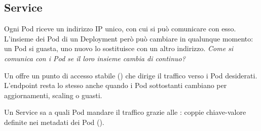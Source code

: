 \subsection{Service}
\label{sec:k8s-service}

Ogni Pod riceve un indirizzo IP unico, con cui si può comunicare con esso. L'insieme dei Pod di un Deployment però
può cambiare in qualunque momento: un Pod si guasta, uno nuovo lo sostituisce con un altro indirizzo. \emph{Come si
comunica con i Pod se il loro insieme cambia di continuo?}

\begin{definizione}[Service]
Un  offre un punto di accesso stabile () che dirige il traffico verso i Pod
desiderati. L'endpoint resta lo stesso anche quando i Pod sottostanti cambiano per aggiornamenti, scaling o guasti.
\end{definizione}

Un Service sa a quali Pod mandare il traffico grazie alle : coppie chiave-valore definite nei metadati
dei Pod ().


